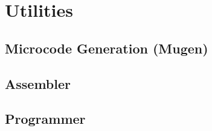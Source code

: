 \section{Utilities}

\subsection{Microcode Generation (Mugen)}

\subsection{Assembler}

\subsection{Programmer}
